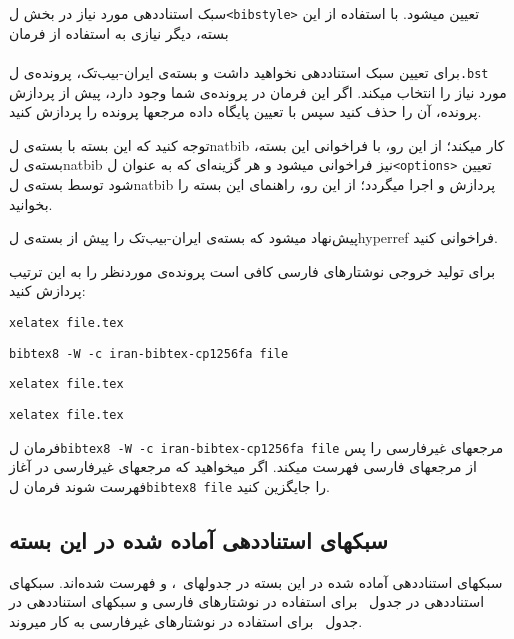 \documentclass[a4paper,11pt]{article}
\begin{document}
سبک استناددهی مورد نیاز در بخش \م‌ل{\tt <bibstyle>} تعیین میشود. با استفاده از این بسته، دیگر نیازی به استفاده از فرمان\\
\hspace*{\fill}\\
برای تعیین سبک استناددهی نخواهید داشت و بسته‌ی ایران-بیب‌تک، پرونده‌ی \م‌ل{\tt *.bst} مورد نیاز را انتخاب میکند. اگر این فرمان در پرونده‌ی شما وجود دارد، پیش از پردازش پرونده، آن را حذف کنید سپس با تعیین پایگاه داده مرجعها پرونده را پردازش کنید.


توجه کنید که این بسته با بسته‌ی \م‌ل{\sffamily natbib} کار میکند؛ از این رو، با فراخوانی این بسته، بسته‌ی \م‌ل{\sffamily natbib} نیز فراخوانی میشود و هر گزینه‌ای که به عنوان \م‌ل{\tt <options>} تعیین شود توسط بسته‌ی \م‌ل{\sffamily natbib} پردازش و اجرا میگردد؛ از این رو، راهنمای این بسته را بخوانید.


پیش‌نهاد میشود که بسته‌ی ایران-بیب‌تک را پیش از بسته‌ی \م‌ل{\sffamily hyperref} فراخوانی کنید.


برای تولید خروجی نوشتارهای فارسی کافی است پرونده‌ی موردنظر را به این ترتیب پردازش کنید:
\begin{itemize}[nosep]
\begin{latin}
\item \texttt{xelatex file.tex}
\item \texttt{bibtex8 -W -c iran-bibtex-cp1256fa file}
\item \texttt{xelatex file.tex}
\item \texttt{xelatex file.tex}
\end{latin}
\end{itemize}


فرمان \م‌ل{\tt bibtex8 -W -c iran-bibtex-cp1256fa file} مرجعهای غیرفارسی را پس از مرجعهای فارسی فهرست میکند. اگر میخواهید که مرجعهای غیرفارسی در آغاز فهرست شوند فرمان \م‌ل{\tt bibtex8 file} را جایگزین کنید.




\subsection{سبکهای استناددهی آماده شده در این بسته}

سبکهای استناددهی آماده شده در این بسته در جدولهای~، و  فهرست شده‌اند. سبکهای استناددهی در جدول~ برای استفاده در نوشتارهای فارسی و سبکهای استناددهی در جدول~ برای استفاده در نوشتارهای غیرفارسی به کار میروند.
\end{document}
